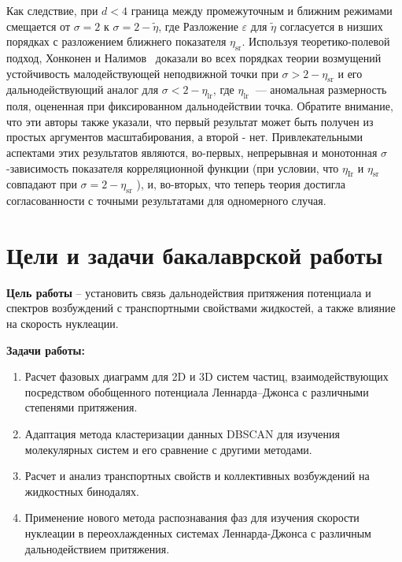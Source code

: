 Как следствие, при $d<4$ граница между промежуточным и ближним режимами смещается от $\sigma=2$ к $\sigma=2-\tilde{\eta}$, где Разложение $\varepsilon$ для $\tilde{\eta}$ согласуется в низших порядках с разложением ближнего показателя $\eta_{\mathrm{sr}}$. Используя теоретико-полевой подход, Хонконен и Налимов~\cite{10.1088/0305-4470/22/6/024} доказали во всех порядках теории возмущений устойчивость малодействующей неподвижной точки при $\sigma>2-\eta_{\mathrm{sr}}$ и его дальнодействующий аналог для $\sigma<2-\eta_{\mathrm{lr}}$, где $\eta_{\text {lr }}$ — аномальная размерность поля, оцененная при фиксированном дальнодействии точка. Обратите внимание, что эти авторы также указали, что первый результат может быть получен из простых аргументов масштабирования, а второй - нет. Привлекательными аспектами этих результатов являются, во-первых, непрерывная и монотонная $\sigma$-зависимость показателя корреляционной функции (при условии, что $\eta_{\mathrm{Ir}}$ и $\eta_{\mathrm{sr}}$ совпадают при $\sigma=2-\eta_{\mathrm{sr}}$ ), и, во-вторых, что теперь теория достигла согласованности с точными результатами для одномерного случая.



\section{Цели и задачи бакалаврской работы}

\textbf{Цель работы} -- установить связь дальнодействия притяжения потенциала и спектров возбуждений с транспортными свойствами жидкостей, а также влияние на скорость нуклеации.

\textbf{Задачи работы:}
\begin{enumerate}
    \item Расчет фазовых диаграмм для 2D и 3D систем частиц, взаимодействующих посредством обобщенного потенциала Леннарда--Джонса с различными степенями притяжения.
    \item Адаптация метода кластеризации данных DBSCAN для изучения молекулярных систем и его сравнение с другими методами.
    \item Расчет и анализ транспортных свойств и коллективных возбуждений на жидкостных бинодалях.
    \item Применение нового метода распознавания фаз для изучения скорости нуклеации в переохлажденных системах Леннарда-Джонса с различным дальнодействием притяжения.
\end{enumerate}
